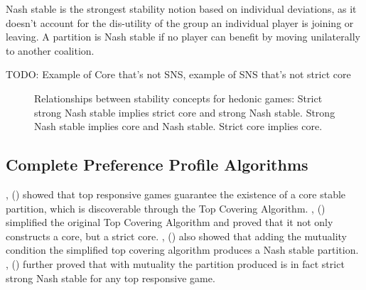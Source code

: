 \documentclass[letterpaper]{article} %
\newcommand{\citename}[1]{\citeauthor{#1}, (\citeyear{#1})}
\theoremstyle{definition}
\begin{document}
Nash stable is the strongest stability notion based on individual deviations, as it doesn't account for the dis-utility of the group an individual player is joining or leaving. A partition is Nash stable if no player can benefit by moving unilaterally to another coalition.

TODO: Example of Core that's not SNS, example of SNS that's not strict core

\begin{figure}
\centering
{}
\caption{Relationships between stability concepts for hedonic games: Strict strong Nash stable implies strict core and strong Nash stable. Strong Nash stable implies core and Nash stable. Strict core implies core.}
\end{figure}

\subsection{Complete Preference Profile Algorithms} \label{section:top_covering}

\citename{ALCALDE2004869} showed that top responsive games guarantee the existence of a core stable partition, which is discoverable through the Top Covering Algorithm. \citename{DIMITROV2007130} simplified the original Top Covering Algorithm and proved that it not only constructs a core, but a strict core. \citename{Dimitrov2006TopRA} also showed that adding the mutuality condition the simplified top covering algorithm produces a Nash stable partition. \citename{Aziz:2012:ESH:2343776.2343806} further proved that with mutuality the partition produced is in fact strict strong Nash stable for any top responsive game.
\end{document}

